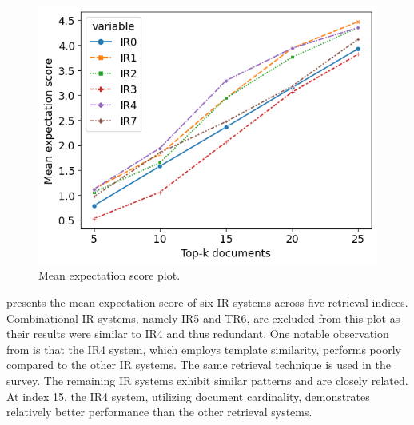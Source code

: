 \begin{figure}[h]
	\centering
	\includegraphics[width=.85\textwidth]{images/subplots/mean_expectation_score.png}
	\caption{Mean expectation score plot. \label{fig:mae_fig}}
\end{figure}

 presents the mean expectation score of six IR systems across five retrieval indices. Combinational IR systems, namely IR5 and TR6, are excluded from this plot as their results were similar to IR4 and thus redundant. One notable observation from  is that the IR4 system, which employs template similarity, performs poorly compared to the other IR systems. The same retrieval technique is used in the survey. The remaining IR systems exhibit similar patterns and are closely related. At index 15, the IR4 system, utilizing document cardinality, demonstrates relatively better performance than the other retrieval systems.


